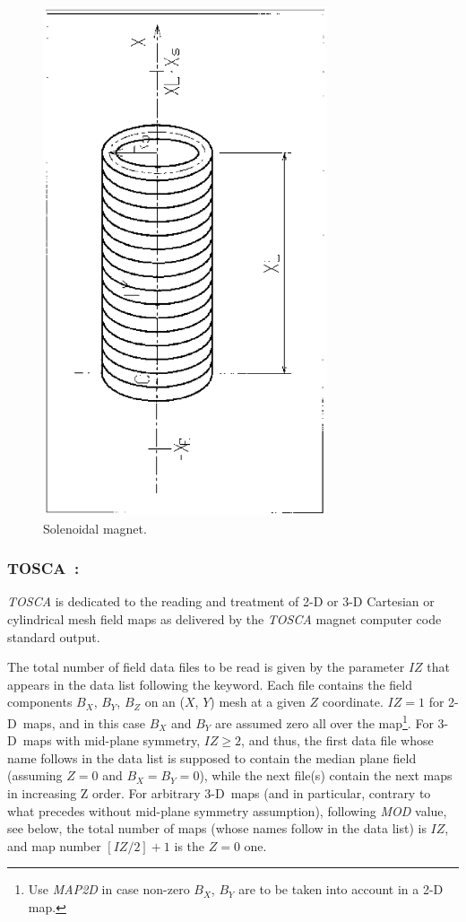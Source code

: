 \begin{figure}[H]
\centerline{\includegraphics[height=15cm,angle=-90]{Fig30.ps}}
\caption{\label{fig30} Solenoidal magnet.}
\end{figure}
\vfill




\newpage

\subsubsection*{TOSCA~: \TOSCATitl} \label{TOSCA} 
\medskip

 \textsl{TOSCA} is dedicated to the reading and treatment of 2-D or 
3-D Cartesian or cylindrical mesh field maps as  delivered by the
\textsl{TOSCA}  magnet computer code standard output.
\bigskip

\noindent The total number of field data files to be read is given by the 
parameter $IZ$ that appears in the data list following the keyword. 
Each file contains the field components $B_X$, $B_Y$, $B_Z$ on an 
($X$, $Y$) mesh at a given $Z$ coordinate. $IZ = 1$ for 2-D~maps, and 
in this case $B_X$ and $B_Y$ are assumed  zero all over the map\footnote{Use 
\textsl{MAP2D} in case non-zero $B_X$, $B_Y$ are to be taken into account in a 2-D map.}. 
For 3-D~maps with mid-plane symmetry, $IZ\ge 2$, and thus, the first 
data file whose name follows in the data list is supposed to contain the median 
plane field (assuming $ Z=0 $ and  $ B_X=B_Y=0$), while the next 
file(s) contain the next maps in increasing Z order. For arbitrary 3-D~maps 
(and in particular, contrary to what precedes without 
mid-plane symmetry assumption), following \textsl{MOD} value, see below, 
 the total number of maps (whose names follow in the data list) 
is $IZ$, and  map number $[IZ/2]+1$ is the $Z = 0$ one.
\bigskip

